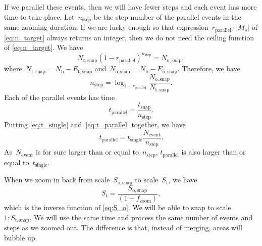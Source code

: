 \documentclass[ijgi,article,submit,moreauthors,pdftex]{Definitions/mdpi}
\begin{document}
If we parallel these events, 
then we will have fewer steps and 
each event has more time to take place.
Let~$n_\mathrm{step}$ be the step number of the parallel events 
in the same zooming duration.
If we are lucky enough so that
expression~$r_\mathrm{parallel} \cdot |M_s|$ of \eq\ref{eq:n_target}
always returns an integer, 
then we do not need the ceiling function of \eq\ref{eq:n_target}.
We have 
\begin{equation*}
N_\mathrm{t,snap} (1-r_\mathrm{parallel})^{n_\mathrm{step}} = N_\mathrm{o,snap},
\end{equation*}
where~$N_\mathrm{t,snap} = N_\mathrm{b}- E_\mathrm{t,snap}$ 
and~$N_\mathrm{o,snap} = N_\mathrm{b}- E_\mathrm{o,snap}$.
Therefore, we have
\begin{equation*}
n_\mathrm{step} = \log_{1-r_\mathrm{parallel}} 
    \frac{N_\mathrm{o,snap}}{N_\mathrm{t,snap}}.
\end{equation*}
Each of the parallel events has time
\begin{equation}
\label{eq:t_parallel}
t_\mathrm{parallel} = \frac{t_\mathrm{snap}}{n_\mathrm{step}}.
\end{equation}
Putting \eqs\ref{eq:t_single} and~\ref{eq:t_parallel} together,
we have
\begin{equation}
\label{eq:t_compare}
t_\mathrm{parallel} = t_\mathrm{single}  \frac{N_\mathrm{event}}{n_\mathrm{step}}.
\end{equation}
As~$N_\mathrm{event}$ is for sure larger than or equal to~$n_\mathrm{step}$,
$t_\mathrm{parallel}$ is also larger than or equal to~$t_\mathrm{single}$.


When we zoom in back from scale~$S_\mathrm{o,snap}$ to scale~$S_\mathrm{t}$, 
we have
\begin{equation}
\label{eq:S_i}
S_\mathrm{t} = \frac{S_\mathrm{o,snap}}{(1 + f_\mathrm{zoom})},
\end{equation}
which is the inverse function of \eq\ref{eq:S_o}.
We will be able to snap to scale~$1:S_\mathrm{t,snap}$.
We will use the same time and process the same number of events and steps as we zoomed out.
The difference is that, instead of merging, areas will bubble up.
\end{document}
